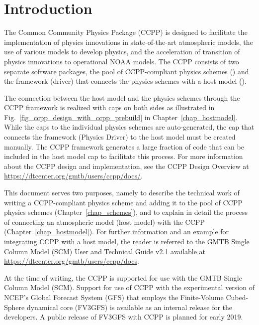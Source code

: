 \chapter{Introduction}\label{chap_introduction}
\setlength{\parskip}{12pt}

The Common Community Physics Package (CCPP) is designed to facilitate the implementation of physics innovations in state-of-the-art atmospheric models, the use of various models to develop physics, and the acceleration of transition of physics innovations to operational NOAA models. The CCPP consists of two separate software packages, the pool of CCPP-compliant physics schemes () and the framework (driver) that connects the physics schemes with a host model ().

The connection between the host model and the physics schemes through the CCPP framework is realized with caps on both sides as illustrated in Fig.~\ref{fig_ccpp_design_with_ccpp_prebuild} in Chapter~\ref{chap_hostmodel}. While the caps to the individual physics schemes are auto-generated, the cap that connects the framework (Physics Driver) to the host model must be created manually. The CCPP framework generates a large fraction of code that can be included in the host model cap to facilitate this process. For more information about the CCPP design and implementation, see the CCPP Design Overview at {\url{https://dtcenter.org/gmtb/users/ccpp/docs/}}.

This document serves two purposes, namely to describe the technical work of writing a CCPP-compliant physics scheme and adding it to the pool of CCPP physics schemes (Chapter~\ref{chap_schemes}), and to explain in detail the process of connecting an atmospheric model (host model) with the CCPP (Chapter~\ref{chap_hostmodel}). For further information and an example for integrating CCPP with a host model, the reader is referred to the GMTB Single Column Model (SCM) User and Technical Guide v2.1 available at {\url{https://dtcenter.org/gmtb/users/ccpp/docs}}.

At the time of writing, the CCPP is supported for use with the GMTB Single Column Model (SCM). Support for use of CCPP with the experimental version of NCEP's Global Forecast System (GFS) that employs the Finite-Volume Cubed-Sphere dynamical core (FV3GFS) is available as an internal release for the developers. A public release of FV3GFS with CCPP is planned for early 2019.


